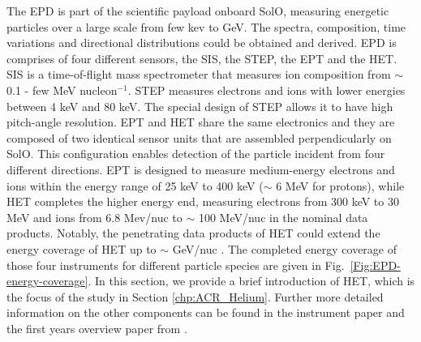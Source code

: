 The \ac{EPD} \citep{RodriguezPacheco-2019-EPD} is part of the scientific payload onboard \ac{SolO}, measuring energetic particles over a large scale from few kev to GeV. The spectra, composition, time variations and directional distributions could be obtained and derived.
\ac{EPD} is comprises of four different sensors, the \ac{SIS}, the \ac{STEP}, the \ac{EPT} and the \ac{HET}. 
\ac{SIS} is a time-of-flight mass spectrometer that measures ion composition from $\sim$ 0.1 - few MeV nucleon$^{-1}$. \ac{STEP} measures electrons and ions with lower energies between 4 keV and 80 keV. The special design of \ac{STEP} allows it to have high pitch-angle resolution.
\ac{EPT} and \ac{HET} share the same electronics and they are composed of two identical sensor units that are assembled perpendicularly on \ac{SolO}. This configuration enables detection of the particle incident from four different directions. \ac{EPT} is designed to measure medium-energy electrons and ions within the energy range of 25 keV to 400 keV ($\sim$ 6 MeV for protons), while \ac{HET} completes the higher energy end, measuring electrons from 300 keV to 30 MeV and ions from 6.8 Mev/nuc to $\sim$ 100 MeV/nuc in the nominal data products. Notably, the penetrating data products of \ac{HET} could extend the energy coverage of \ac{HET} up to $\sim$ GeV/nuc \citep{Elftmann-2020-PhD}.
The completed energy coverage of those four instruments for different particle species are given in Fig.~\ref{Fig:EPD-energy-coverage}.
In this section, we provide a brief introduction of \ac{HET}, which is the focus of the study in Section \ref{chp:ACR_Helium}. Further more detailed information on the other components can be found in the instrument paper \citep{RodriguezPacheco-2019-EPD} and the first years overview paper from \citet{Wimmer2021AA}.


